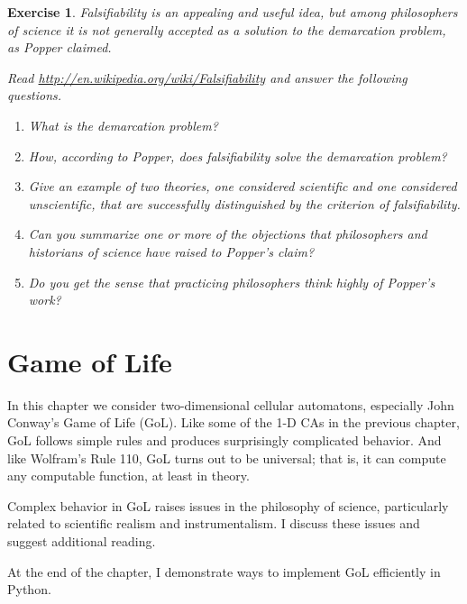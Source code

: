 \documentclass[12pt]{book}
\theoremstyle{exercise}
\newtheorem{exercise}{Exercise}[chapter]
\begin{document}
\begin{exercise}

Falsifiability is an appealing and useful idea, but among
philosophers of science it is not generally accepted
as a solution to the demarcation problem, as Popper claimed.

Read \url{http://en.wikipedia.org/wiki/Falsifiability} and answer the
following questions.

\begin{enumerate}

\item What is the demarcation problem?

\item How, according to Popper, does falsifiability solve the
demarcation problem?

\item Give an example of two theories, one considered scientific
and one considered unscientific, that are successfully distinguished
by the criterion of falsifiability.

\item Can you summarize one or more of the objections that
philosophers and historians of science have raised to Popper's
claim?

\item Do you get the sense that practicing philosophers think
highly of Popper's work?

\end{enumerate}

\end{exercise}




\chapter{Game of Life}

In this chapter we consider two-dimensional cellular automatons,
especially John Conway's Game of Life (GoL).  Like some of
the 1-D CAs in the previous chapter, GoL follows simple rules and
produces surprisingly complicated behavior.  And like Wolfram's
Rule 110, GoL turns out to be universal; that is, it can compute
any computable function, at least in theory.

Complex behavior in GoL raises issues in the philosophy of
science, particularly related to scientific realism and instrumentalism.
I discuss these issues and suggest additional reading.

At the end of the chapter, I demonstrate ways to implement
GoL efficiently in Python.
\end{document}
